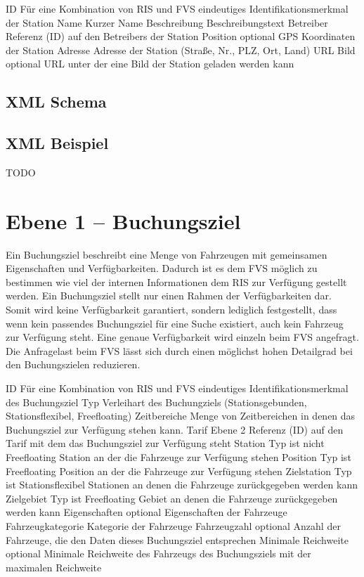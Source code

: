 ID		Für eine Kombination von RIS und FVS eindeutiges Identifikationsmerkmal der Station
Name		Kurzer Name
Beschreibung		Beschreibungstext
Betreiber		Referenz (ID) auf den Betreibers der Station
Position	optional	GPS Koordinaten der Station
Adresse		Adresse der Station (Straße, Nr., PLZ, Ort, Land)
URL Bild	optional	URL unter der eine Bild der Station geladen werden kann

\subsection{XML Schema}


\subsection{XML Beispiel}
TODO

\section{Ebene 1 -- Buchungsziel}
Ein Buchungsziel beschreibt eine Menge von Fahrzeugen mit gemeinsamen Eigenschaften und Verfügbarkeiten. Dadurch ist es dem FVS möglich zu bestimmen wie viel der internen Informationen dem RIS zur Verfügung gestellt werden. Ein Buchungsziel stellt nur einen Rahmen der Verfügbarkeiten dar. Somit wird keine Verfügbarkeit garantiert, sondern lediglich festgestellt, dass wenn kein passendes Buchungsziel für eine Suche existiert, auch kein Fahrzeug zur Verfügung steht. Eine genaue Verfügbarkeit wird einzeln beim FVS angefragt. Die Anfragelast beim FVS lässt sich durch einen möglichst hohen Detailgrad bei den Buchungszielen reduzieren.

ID		Für eine Kombination von RIS und FVS eindeutiges Identifikationsmerkmal des Buchungsziel
Typ		Verleihart des Buchungziels (Stationsgebunden, Stationsflexibel, Freefloating)
Zeitbereiche		Menge von Zeitbereichen in denen das Buchungsziel zur Verfügung stehen kann.
Tarif	Ebene 2	Referenz (ID) auf den Tarif mit dem das Buchungsziel zur Verfügung steht
Station	Typ ist nicht Freefloating	Station an der die Fahrzeuge zur Verfügung stehen
Position	Typ ist Freefloating	Position an der die Fahrzeuge zur Verfügung stehen
Zielstation 	Typ ist Stationsflexibel	Stationen an denen die Fahrzeuge zurückgegeben werden kann
Zielgebiet	Typ ist Freefloating	Gebiet an denen die Fahrzeuge zurückgegeben werden kann
Eigenschaften	optional	Eigenschaften der Fahrzeuge
Fahrzeugkategorie		Kategorie der Fahrzeuge
Fahrzeugzahl	optional	Anzahl der Fahrzeuge, die den Daten dieses Buchungsziel entsprechen
Minimale Reichweite	optional	Minimale Reichweite des Fahrzeugs des Buchungsziels mit der maximalen Reichweite

